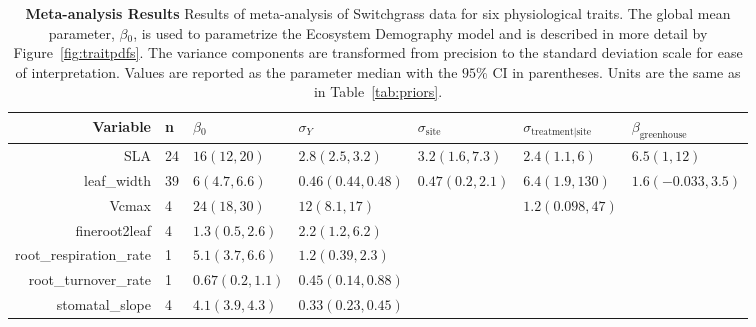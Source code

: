 \begin{sidewaystable}[ht]
\centering
\begin{tabular}{rllllll}
  \hline
Variable & n & $\beta{_0}$ & $\sigma_{Y}$ & $\sigma_{\text{site}}$ & $\sigma_{\text{treatment|site}}$ & $\beta_{\text{greenhouse}}$ \\ 
  \hline
SLA & 24 & $16(12,20)$ & $2.8(2.5,3.2)$ & $3.2(1.6,7.3)$ & $2.4(1.1,6)$ & $6.5(1,12)$ \\ 
  leaf_width & 39 & $6(4.7,6.6)$ & $0.46(0.44,0.48)$ & $0.47(0.2,2.1)$ & $6.4(1.9,130)$ & $1.6(-0.033,3.5)$ \\ 
  Vcmax & 4 & $24(18,30)$ & $12(8.1,17)$ &  & $1.2(0.098,47)$ &  \\ 
  fineroot2leaf & 4 & $1.3(0.5,2.6)$ & $2.2(1.2,6.2)$ &  &  &  \\ 
  root_respiration_rate & 1 & $5.1(3.7,6.6)$ & $1.2(0.39,2.3)$ &  &  &  \\ 
  root_turnover_rate & 1 & $0.67(0.2,1.1)$ & $0.45(0.14,0.88)$ &  &  &  \\ 
  stomatal_slope & 4 & $4.1(3.9,4.3)$ & $0.33(0.23,0.45)$ &  &  &  \\ 
   \hline
\end{tabular}
\caption{{\bf Meta-analysis Results} Results of meta-analysis of Switchgrass data for six physiological traits.  The global mean parameter, $\beta{_0}$, is used to parametrize the Ecosystem Demography model and is described in more detail by Figure~\ref{fig:traitpdfs}. The variance components are transformed from precision to the standard deviation scale for ease of interpretation. Values are reported as the parameter median with the $95\%$ CI in parentheses. Units are the same as in Table~\ref{tab:priors}.} 
\label{tab:maresults}
\end{sidewaystable}
